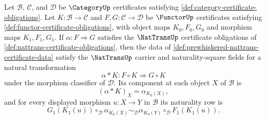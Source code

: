 \begin{theorem}
\label{thm:nattrans-prewhiskering-by-functor-certificate}
Let $\mathcal B$, $\mathcal C$, and $\mathcal D$ be $\CategoryUp$ certificates satisfying \autoref{def:category-certificate-obligations}. Let $K:\mathcal B\to\mathcal C$ and $F,G:\mathcal C\to\mathcal D$ be $\FunctorUp$ certificates satisfying \autoref{def:functor-certificate-obligations}, with object maps $K_0,F_0,G_0$ and morphism maps $K_1,F_1,G_1$. If $\alpha:F\Rightarrow G$ satisfies the $\NatTransUp$ certificate obligations of \autoref{def:nattrans-certificate-obligations}, then the data of \autoref{def:prewhiskered-nattrans-certificate-data} satisfy the $\NatTransUp$ carrier and naturality-square fields for a natural transformation
$$
\alpha\ast K:F\circ K\Rightarrow G\circ K
$$
under the morphism classifier of $\mathcal D$. Its component at each object $X$ of $\mathcal B$ is
$$
(\alpha\ast K)_X=\alpha_{K_0(X)},
$$
and for every displayed morphism $u:X\to Y$ in $\mathcal B$ its naturality row is
$$
G_1(K_1(u))\circ_{\mathcal D}\alpha_{K_0(X)}
\sim_{\mathcal D}
\alpha_{K_0(Y)}\circ_{\mathcal D}F_1(K_1(u)).
$$
\end{theorem}
